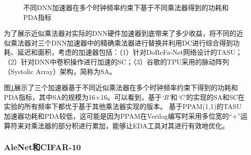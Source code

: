 \begin{figure}[!ht]
    \centering
    \setcounter{subfigure}{0}
    \centering
    \caption{不同DNN加速器在多个时钟频率约束下基于不同乘法器得到的功耗和PDA指标}
    \label{AC:AM:Adapt:Fig:Accs}
\end{figure}

为了展示近似乘法器对实际的DNN硬件加速器到底带来了多少收益，将不同的近似乘法器对三个DNN加速器中的精确乘法器进行替换并利用DC进行综合得到功耗、延迟和面积，考虑的加速器包括：（1）针对DoReFa-Net网络\cite{DNN:DoReFa-Net}设计的TASU\cite{Accelerator:JiaoLi}；（2）针对DNN中卷积操作进行加速的SC\cite{Accelerator:SC}；（3）谷歌的TPU采用的脉动阵列（Systolic Array）架构\cite{Accelerator:TPU}，简称为SA。

图\ref{AC:AM:Adapt:Fig:Accs}展示了三个加速器基于不同近似乘法器在多个时钟频率约束下得到的功耗和PDA指标，其中SA的规模为16$\times$16。可以看到，基于\emph{`B'}和\emph{`C'}的实现的SA和SC在实验的所有频率下都优于基于其他乘法器实现的版本。
基于PPAM(1,1)的TASU加速器功耗和PDA较低，这可能是因为PPAM在Verilog编写时采用多位宽的“+”运算符来对乘法器的部分积进行累加，能够让EDA工具对其进行有效地优化。

\subsubsection{AleNet和CIFAR-10}

